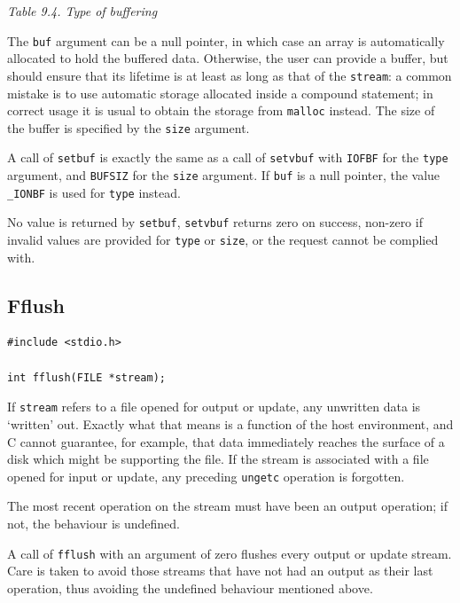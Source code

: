 \begin{center}\textit{Table 9.4. Type of buffering}\end{center}


   The \texttt{buf} argument can be a null pointer,  in  which  case  an
    array  is automatically allocated to hold the buffered data.  Otherwise,
    the user can provide a buffer, but should  ensure that its lifetime is at
    least as long as that of the \texttt{stream}: a common mistake  is  to
    use  automatic  storage  allocated inside a compound statement; in correct
    usage it is usual to obtain the storage from \texttt{malloc} instead.
    The  size  of  the buffer is specified by the \texttt{size}
    argument.


   A call of \texttt{setbuf} is exactly the same as a  call  of
    \texttt{setvbuf} with   \texttt{IOFBF}  for the \texttt{type}
    argument, and \texttt{BUFSIZ} for the \texttt{size} argument.  If
    \texttt{buf} is a null pointer,  the  value  \texttt{\_IONBF}  is
    used for \texttt{type} instead.


   No value is returned by  \texttt{setbuf},  \texttt{setvbuf}
    returns  zero  on success, non-zero if invalid values are provided for
    \texttt{type} or \texttt{size}, or the request cannot be complied
    with.


  

  \subsection{Fflush}
   

   \begin{Verbatim}
#include <stdio.h>

int fflush(FILE *stream);
\end{Verbatim}

   If \texttt{stream} refers to a file opened for output or update,  any
    unwritten data is `written' out.  Exactly what that means is
    a function of the host environment, and C cannot  guarantee, for  example,
    that data immediately reaches the surface of a disk which might be
    supporting the file.  If the  stream  is associated  with  a  file  opened
    for  input or update, any preceding \texttt{ungetc} operation is
    forgotten.


   The most recent operation on the stream must  have  been  an output
    operation; if not, the behaviour is undefined.


   A call of \texttt{fflush} with an  argument  of  zero  flushes  every
    output  or  update  stream.   Care  is  taken to avoid those streams that
    have not had an output as their last operation, thus avoiding the undefined
    behaviour mentioned above.


